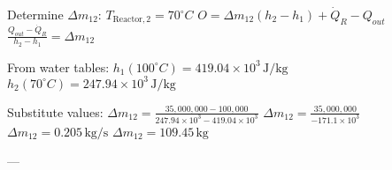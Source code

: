 Determine \( \Delta m_{12} \):  
\( T_{\text{Reactor},2} = 70^\circ C \)  
\( O = \Delta m_{12} (h_2 - h_1) + \dot{Q}_R - Q_{out} \)  
\( \frac{Q_{out} - \dot{Q}_R}{h_2 - h_1} = \Delta m_{12} \)  

From water tables:  
\( h_1 (100^\circ C) = 419.04 \times 10^3 \, \text{J/kg} \)  
\( h_2 (70^\circ C) = 247.94 \times 10^3 \, \text{J/kg} \)  

Substitute values:  
\( \Delta m_{12} = \frac{35,000,000 - 100,000}{247.94 \times 10^3 - 419.04 \times 10^3} \)  
\( \Delta m_{12} = \frac{35,000,000}{-171.1 \times 10^3} \)  
\( \Delta m_{12} = 0.205 \, \text{kg/s} \)  
\( \Delta m_{12} = 109.45 \, \text{kg} \)  

---